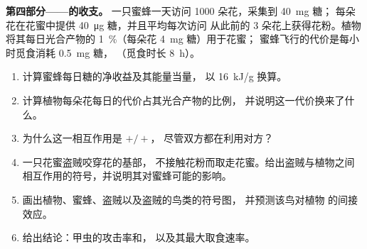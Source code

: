 \begin{problem}
\medskip
\noindent\textbf{第四部分——的收支。}
一只蜜蜂一天访问 1000 朵花，采集到 \qty{40}{mg} 糖；
每朵花在花蜜中提供 \qty{40}{\micro g} 糖，并且平均每次访问
从此前的 3 朵花上获得花粉。植物
将其每日光合产物的 \qty{1}{\%}（每朵花 \qty{4}{mg} 糖）用于花蜜；
蜜蜂飞行的代价是每小时觅食消耗 \qty{0.5}{mg} 糖，
（觅食时长 \qty{8}{h}）。
\begin{enumerate}[resume]
  \item 计算蜜蜂每日糖的净收益及其能量当量，
        以 \qty{16}{kJ/g} 换算。
  \item 计算植物每朵花每日的代价占其光合产物的比例，
        并说明这一代价换来了什么。
  \item 为什么这一相互作用是 $+/+$，
        尽管双方都在利用对方？
  \item 一只花蜜盗贼咬穿花的基部，
        不接触花粉而取走花蜜。给出盗贼与植物之间
        相互作用的符号，并说明其对蜜蜂可能的影响。
  \item 画出植物、蜜蜂、盗贼以及盗贼的鸟类的符号图，
        并预测该鸟对植物
        的间接效应。
  \item 给出结论：甲虫的攻击率和，
        以及其最大取食速率。
\end{enumerate}
\end{problem}
